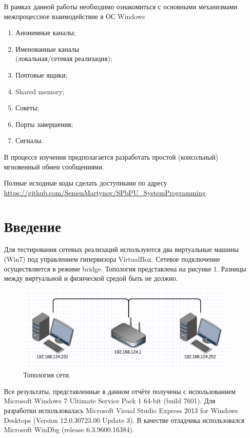 \documentclass[a4paper, 12pt]{report}		%
\begin{document}
В рамках данной работы необходимо ознакомиться с основными механизмами межпроцессное взаимодействие в ОС Windows
\begin{enumerate}
    \item Анонимные каналы;
    \item Именованные каналы \\
        (локальная/сетевая реализация);
    \item Почтовые ящики;
    \item Shared memory;
    \item Сокеты;
    \item Порты завершения;
    \item Сигналы.
\end{enumerate}

В процессе изучения предполагается разработать простой (консольный) мгновенный обмен сообщениями.

Полные исходные коды сделать доступными по адресу \url{https://github.com/SemenMartynov/SPbPU_SystemProgramming}.

\chapter*{Введение}

\vspace{1em}
Для тестирования сетевых реализаций используются два виртуальные машины (Win7) под управлением гипервизора VirtualBox. Сетевое подключение осуществляется в режиме bridge. Топология представлена на рисунке 1. Разницы между виртуальной и физической средой быть не должно.

\begin{figure}[h!]
\centering
\includegraphics[scale=0.7]{res/01_topology}
\caption{Топология сети.}
\end{figure}

\vspace{1em}
Все результаты, представленные в данном отчёте получены с использованием Microsoft Windows 7 Ultimate Service Pack 1 64-bit (build 7601). Для разработки использовалась Microsoft Visual Studio Express 2013 for Windows Desktops (Version 12.0.30723.00 Update 3). В качестве отладчика использовался Microsoft WinDbg (release 6.3.9600.16384).
\end{document}
